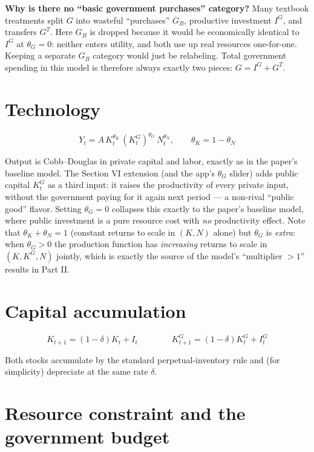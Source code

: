 \documentclass[11pt]{article}
\newcommand{\eq}[1]{\begin{equation}#1\end{equation}}
\begin{document}
\begin{notebox}
\textbf{Why is there no ``basic government purchases'' category?} Many
textbook treatments split $G$ into wasteful ``purchases'' $G_B$, productive
investment $I^G$, and transfers $G^T$. Here $G_B$ is dropped because it
would be economically identical to $I^G$ at $\theta_G=0$: neither enters
utility, and both use up real resources one-for-one. Keeping a separate
$G_B$ category would just be relabeling. Total government spending in this
model is therefore always exactly two pieces: $G = I^G + G^T$.
\end{notebox}

\section{Technology}

\eq{ Y_t = A\,K_t^{\theta_K}\,(K^G_t)^{\theta_G}\,N_t^{\theta_N}, \qquad \theta_K=1-\theta_N }

Output is Cobb--Douglas in private capital and labor, exactly as in the
paper's baseline model. The Section VI extension (and the app's $\theta_G$
slider) adds public capital $K^G_t$ as a third input: it raises the
productivity of every private input, without the government paying for it
again next period --- a non-rival ``public good'' flavor. Setting
$\theta_G=0$ collapses this exactly to the paper's baseline model, where
public investment is a pure resource cost with \emph{no} productivity
effect. Note that $\theta_K+\theta_N=1$ (constant returns to scale in
$(K,N)$ alone) but $\theta_G$ is \emph{extra}: when $\theta_G>0$ the
production function has \emph{increasing} returns to scale in
$(K,K^G,N)$ jointly, which is exactly the source of the model's
``multiplier $>1$'' results in Part II.

\section{Capital accumulation}

\eq{ K_{t+1} = (1-\delta)K_t + I_t \qquad\qquad K^G_{t+1} = (1-\delta)K^G_t + I^G_t }

Both stocks accumulate by the standard perpetual-inventory rule and (for
simplicity) depreciate at the same rate $\delta$.

\section{Resource constraint and the government budget}
\end{document}
